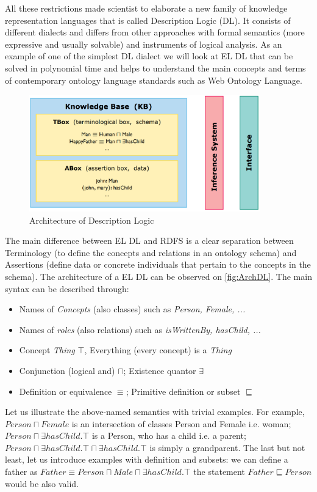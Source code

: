 		All these restrictions made scientist to elaborate a new family of knowledge representation languages that is called Description Logic (DL). It consists of different dialects and differs from other approaches with formal semantics (more expressive and usually solvable) and instruments of logical analysis. As an example of one of the simplest DL dialect we will look at EL DL that can be solved in polynomial time and helps to understand the main concepts and terms of contemporary ontology language standards such as Web Ontology Language.
		
		\begin{figure}
			\centering
			\includegraphics[width=10cm]{images/ELDL.PNG}
			\caption{Architecture of Description Logic \cite[lecture 8, slide 1]{Kon10}}
			\label{fig:ArchDL}
		\end{figure}   
		The main difference between EL DL and RDFS is a clear separation between Terminology (to define the concepts and relations in an ontology schema) and Assertions (define data or concrete individuals that pertain to the concepts in the schema). The architecture of a EL DL can be observed on \autoref{fig:ArchDL}. The main syntax can be described through:
			\begin{itemize}
				\item Names of \textit{Concepts} (also classes) such as \textit{Person, Female, ...} 
				\item Names of \textit{roles} (also relations) such as \textit{isWrittenBy, hasChild, ...}
				\item Concept \textit{Thing} $\top$, Everything (every concept) is a \textit{Thing} 
				\item Conjunction (logical and) $\sqcap$; Existence quantor $\exists$ 
				\item Definition or equivalence $\equiv$; Primitive definition or subset $\sqsubseteq$
			\end{itemize}
		Let us illustrate the above-named semantics with trivial examples. For example,  $Person\sqcap Female$  is an intersection of classes Person and Female i.e. woman; $Person \sqcap \exists hasChild.\top$ is a Person, who has a child i.e. a parent; $Person \sqcap \exists hasChild.\top \sqcap \exists hasChild.\top $ is simply a grandparent. The last but not least, let us introduce examples with definition and subsets: we can define a father as $Father\equiv Person \sqcap Male \sqcap \exists hasChild.\top$ the statement $Father \sqsubseteq Person$ would be also valid.
		
